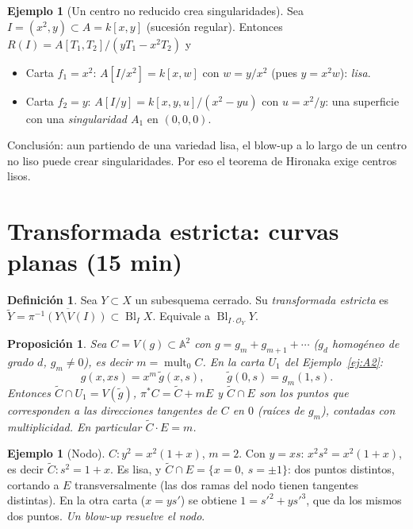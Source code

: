 \documentclass[11pt,a4paper]{article}
\newcommand{\Bl}{\operatorname{Bl}}
\newcommand{\mult}{\operatorname{mult}}
\newcommand{\A}{\mathbb{A}}
\newcommand{\cO}{\mathcal{O}}
\theoremstyle{plain}
\newtheorem{proposicion}[teorema]{Proposición}
\theoremstyle{definition}
\newtheorem{definicion}[teorema]{Definición}
\newtheorem{ejemplo}[teorema]{Ejemplo}
\theoremstyle{remark}
\begin{document}
\begin{ejemplo}[Un centro no reducido crea singularidades]\label{ej:nored}
Sea $I=(x^2,y)\subset A=k[x,y]$ (sucesión regular). Entonces $R(I)=A[T_1,T_2]/(yT_1-x^2T_2)$ y
\begin{itemize}
\item Carta $f_1=x^2$: $A[I/x^2]=k[x,w]$ con $w=y/x^2$ (pues $y=x^2w$): \emph{lisa}.
\item Carta $f_2=y$: $A[I/y]=k[x,y,u]/(x^2-yu)$ con $u=x^2/y$: una superficie con una \emph{singularidad $A_1$} en $(0,0,0)$.
\end{itemize}
Conclusión: aun partiendo de una variedad lisa, el blow-up a lo largo de un centro no liso puede crear singularidades. Por eso el teorema de Hironaka exige centros lisos.
\end{ejemplo}

\section{Transformada estricta: curvas planas (15 min)}

\begin{definicion}
Sea $Y\subset X$ un subesquema cerrado. Su \emph{transformada estricta} es $\tilde Y=\overline{\pi^{-1}(Y\setminus V(I))}\subset\Bl_IX$. Equivale a $\Bl_{I\cdot\cO_Y}Y$.
\end{definicion}

\begin{proposicion}\label{prop:estricta}
Sea $C=V(g)\subset\A^2$ con $g=g_m+g_{m+1}+\cdots$ ($g_d$ homogéneo de grado $d$, $g_m\ne0$), es decir $m=\mult_0C$. En la carta $U_1$ del Ejemplo~\ref{ej:A2}:
\[
g(x,xs)=x^m\,\tilde g(x,s),\qquad \tilde g(0,s)=g_m(1,s).
\]
Entonces $\tilde C\cap U_1=V(\tilde g)$, $\pi^*C=\tilde C+mE$ y $\tilde C\cap E$ son los puntos que corresponden a las direcciones tangentes de $C$ en $0$ (raíces de $g_m$), contadas con multiplicidad. En particular $\tilde C\cdot E=m$.
\end{proposicion}

\begin{ejemplo}[Nodo]\label{ej:nodo}
$C\colon y^2=x^2(1+x)$, $m=2$. Con $y=xs$: $x^2s^2=x^2(1+x)$, es decir $\tilde C\colon s^2=1+x$. Es lisa, y $\tilde C\cap E=\{x=0,\ s=\pm1\}$: dos puntos distintos, cortando a $E$ transversalmente (las dos ramas del nodo tienen tangentes distintas). En la otra carta ($x=ys'$) se obtiene $1=s'^2+ys'^3$, que da los mismos dos puntos. \emph{Un blow-up resuelve el nodo}.
\end{ejemplo}
\end{document}
